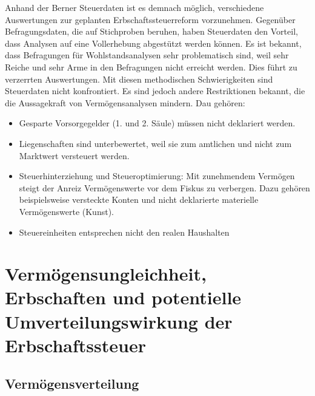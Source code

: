 \documentclass[a4paper, 12pt,liststotoc]{scrartcl}
\numberwithin{equation}{section}
\begin{document}
Anhand der Berner Steuerdaten ist es demnach möglich, verschiedene
Auswertungen zur geplanten Erbschaftssteuerreform vorzunehmen. Gegenüber
Befragungsdaten, die auf Stichproben beruhen, haben Steuerdaten den
Vorteil, dass Analysen auf eine Vollerhebung abgestützt werden können.
Es ist bekannt, dass Befragungen für Wohlstandsanalysen sehr
problematisch sind, weil sehr Reiche und sehr Arme in den Befragungen
nicht erreicht werden. Dies führt zu verzerrten Auswertungen. Mit diesen
methodischen Schwierigkeiten sind Steuerdaten nicht konfrontiert. Es
sind jedoch andere Restriktionen bekannt, die die Aussagekraft von
Vermögensanalysen mindern. Dau gehören:

\begin{itemize}
\item
  Gesparte Vorsorgegelder (1. und 2. Säule) müssen nicht deklariert
  werden.
\item
  Liegenschaften sind unterbewertet, weil sie zum amtlichen und nicht
  zum Marktwert versteuert werden.
\item
  Steuerhinterziehung und Steueroptimierung: Mit zunehmendem Vermögen
  steigt der Anreiz Vermögenswerte vor dem Fiskus zu verbergen. Dazu
  gehören beispielsweise versteckte Konten und nicht deklarierte
  materielle Vermögenswerte (Kunst).
\item
  Steuereinheiten entsprechen nicht den realen Haushalten
\end{itemize}

\section{Vermögensungleichheit, Erbschaften und potentielle
  Umverteilungswirkung der
  Erbschaftssteuer}\label{vermuxf6gensungleichheit-erbschaften-und-potentielle-umverteilungswirkung-der-erbschaftssteuer}
\subsection{Vermögensverteilung}\label{vermuxf6gensverteilung}
\end{document}
